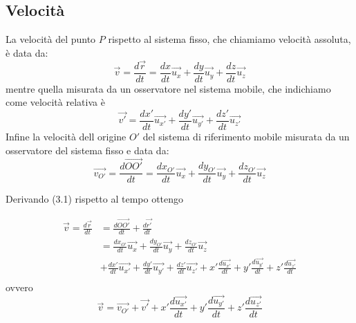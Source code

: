 \documentclass[class=book, crop=false, oneside, 12pt]{standalone}
\begin{document}
\subsection{Velocità}

La velocità del punto \(P\) rispetto al sistema fisso, che chiamiamo velocità assoluta, è data da:
\begin{equation}
    \overrightarrow{v} = \frac{d \overrightarrow{r}}{dt} = \frac{dx}{dt} \overrightarrow{u_x} + \frac{dy}{dt} \overrightarrow{u_y} + \frac{dz}{dt} \overrightarrow{u_z}
\end{equation}
mentre quella misurata da un osservatore nel sistema mobile, che indichiamo come velocità relativa è
\begin{equation}
    \overrightarrow{v'} = \frac{dx'}{dt} \overrightarrow{u_{x'}} +\frac{dy'}{dt} \overrightarrow{u_{y'}} + \frac{dz'}{dt} \overrightarrow{u_{z'}}
\end{equation}
Infine la velocità dell origine \(O'\) del sistema di riferimento mobile misurata da un osservatore del sistema fisso e data da:
\begin{equation}
    \overrightarrow{v_{O'}}=\frac{d \overrightarrow{OO'}}{d t}=\frac{d x_{O'}}{d t} \overrightarrow{u_{x}}+\frac{d y_{O'}}{d t} \overrightarrow{u_{y}}+\frac{d z_{O'}}{d t} \overrightarrow{u_{z}}
\end{equation}

Derivando (3.1) rispetto al tempo ottengo

\begin{align*}
    \overrightarrow{v} = \frac{d \overrightarrow{r}}{dt} & = \frac{d \overrightarrow{OO'}}{d t} + \frac{d \overrightarrow{r'}}{dt} \\
    & = \frac{d x_{O'}}{d t} \overrightarrow{u_{x}}+\frac{d y_{O'}}{d t} \overrightarrow{u_{y}}+\frac{d z_{O'}}{d t} \overrightarrow{u_{z}}\\
        &+\frac{dx'}{dt} \overrightarrow{u_{x'}} + \frac{dy'}{dt} \overrightarrow{u_{y'}} + \frac{dz'}{dt} \overrightarrow{u_{z'}} + x' \frac{d\overrightarrow{u_{x'}}}{dt}  + y' \frac{d\overrightarrow{u_{y'}}}{dt}  + z' \frac{d\overrightarrow{u_{z'}}}{dt}\\
\end{align*}
ovvero
\begin{equation}
    \overrightarrow{v} = \overrightarrow{v_{O'}} + \overrightarrow{v'} + x' \frac{d\overrightarrow{u_{x'}}}{dt}  + y' \frac{d\overrightarrow{u_{y'}}}{dt}  + z' \frac{d\overrightarrow{u_{z'}}}{dt}
\end{equation}
\end{document}
